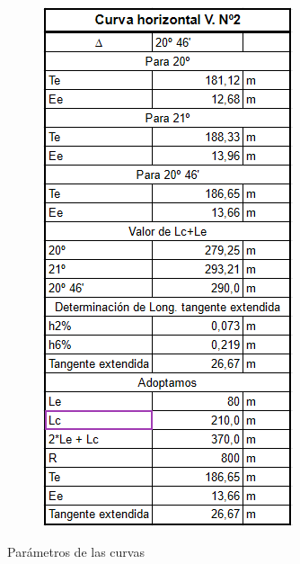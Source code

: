 \documentclass[../main.tex]{subfiles}
\begin{document}
\begin{figure}[ht]
\begin{subfigure}{.5\textwidth}
  \label{fig:curva1}
\end{subfigure}%
\begin{subfigure}{.5\textwidth}
  \centering
  \includegraphics[width=0.85\linewidth]{images/google_sheets/Screenshot_4.png}
  \label{fig:curva2}
\end{subfigure}
\caption{Parámetros de las curvas}
\end{figure}
\end{document}
